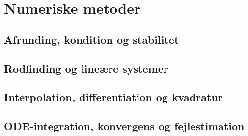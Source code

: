 \chapter{Numeriske metoder}
\section{Afrunding, kondition og stabilitet}
\leavevmode\par

\section{Rodfinding og lineære systemer}
\leavevmode\par

\section{Interpolation, differentiation og kvadratur}
\leavevmode\par

\section{ODE-integration, konvergens og fejlestimation}
\leavevmode\par
